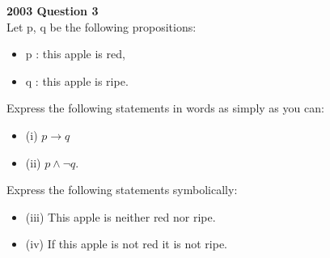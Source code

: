 
\textbf{2003 Question 3}\\
Let p, q be the following propositions:
\begin{itemize}
	\item p : this apple is red, 
	\item q : this apple is ripe.
\end{itemize}

Express the following statements in words as simply as you can:
\begin{itemize}
	\item (i) $p \rightarrow q$
	\item (ii) $p \wedge \neg q$.
\end{itemize}


Express the following statements symbolically:
\begin{itemize}
	\item (iii) This apple is neither red nor ripe.
	\item (iv) If this apple is not red it is not ripe.
\end{itemize}
